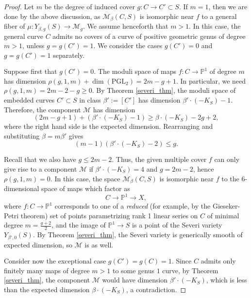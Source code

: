 \documentclass[12pt]{amsart}
\def\cM{{\mathcal{M}}}
\def\P{\mathbb{P}}
\begin{document}
 \begin{proof}
Let $m$ be the degree of induced cover $g:C\to C'\subset S$. If $m=1$, then we are done by the above discussion, as $\cM_{\beta}(C,S)$ is isomorphic near $f$ to a general fiber of $\mu:Y_{\beta,g}(S)\to\cM_g$. We assume henceforth that $m>1$. In this case, the general curve $C$ admits no covers of a curve of positive geometric genus of degree $m>1$, unless $g=g(C')=1$. We consider the cases $g(C')=0$ and $g=g(C')=1$ separately.

Suppose first that $g(C')=0$. The moduli space of maps $f:C\to \P^1$ of degree $m$ has dimension $\rho(g,1,m)+\dim(\text{PGL}_2)=2m-g+1$. In particular, we need $\rho(g,1,m)=2m-2-g\ge0$.
By Theorem \ref{severi_thm}, the moduli space of embedded curves $C'\subset S$ in class $\beta':=[C']$ has dimension $\beta'\cdot (-K_S)-1$. Therefore, the component $\cM$ has dimension
        \begin{equation*}
            (2m-g+1)+(\beta'\cdot (-K_S)-1) \ge \beta\cdot (-K_S)-2g+2,
        \end{equation*}
        where the right hand side is the expected dimension. Rearranging and substituting $\beta=m\beta'$ gives
       \begin{equation*}
              (m-1)(\beta'\cdot (-K_S)-2) \le g.
         \end{equation*} 
         
Recall that we also have $g\le 2m-2$. Thus, the given multiple cover $f$ can only give rise to a component $\cM$ if $\beta'\cdot (-K_S)=4$ and $g=2m-2$, hence $\rho(g,1,m)=0$. In this case, the space $\cM_\beta(C,S)$ is isomorphic near $f$ to the 6-dimensional space of maps which factor as 
        \begin{equation*}
            C\to \P^1\to X,
        \end{equation*}
        where $f:C\to\P^1$ corresponds to one of a \emph{reduced} (for example, by the Gieseker-Petri theorem) set of points parametrizing rank 1 linear series on $C$ of minimal degree $m=\frac{g+2}{2}$, and the image of $\P^1\to S$ is a point of the Severi variety $Y_{\beta',0}(S)$. By Theorem \ref{severi_thm}, the Severi variety is generically smooth 
        of expected dimension, so $\cM$ is as well.
        
Consider now the exceptional case $g(C')=g(C)=1$. Since $C$ admits only finitely many maps of degree $m>1$ to some genus $1$ curve, by Theorem \ref{severi_thm}, the component $\cM$ would have dimension $\beta' \cdot (-K_S)$, which is less than the expected dimension $\beta\cdot (-K_S)$, a contradiction.

 \end{proof}
\end{document}

